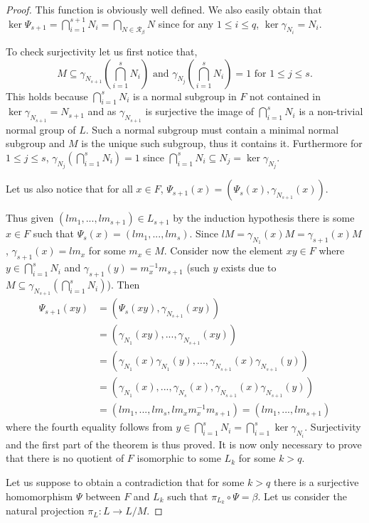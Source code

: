 \begin{proof}
    This function is obviously well defined. 
    We also easily obtain that $\ker \Psi_{s+1} = \bigcap_{i=1}^{s+1} N_i =\bigcap_{N \in \mathscr{R}_\beta}N$ since for any $1 \le i \le q$, $\ker \gamma_{N_i} = N_i$.

    To check surjectivity let us first notice that, 
    $$M \subseteq \gamma_{N_{s+1}}(\bigcap_{i=1}^s N_i) \text{ and } \gamma_{N_{j}}(\bigcap_{i=1}^s N_i) = 1 \text{ for } 1 \le j \le s.$$ 
    This holds because $\bigcap_{i=1}^s N_i$ is a normal subgroup in $F$ not contained in $\ker \gamma_{N_{s+1}} = N_{s+1}$ and as $\gamma_{N_{s+1}}$ is surjective the image of $\bigcap_{i=1}^s N_i$ is a non-trivial normal group of $L$. 
    Such a normal subgroup must contain a minimal normal subgroup and $M$ is the unique such subgroup, thus it contains it. 
    Furthermore for $1 \le j \le s$, $\gamma_{N_j}(\bigcap_{i=1}^s N_i) = 1$ since $\bigcap_{i=1}^s N_i \subseteq N_j = \ker \gamma_{N_j}$. 
    
    Let us also notice that for all $x \in F$, $\Psi_{s+1}(x) = (\Psi_{s}(x), \gamma_{N_{s+1}}(x))$.

    Thus given $(lm_1, ..., lm_{s+1}) \in L_{s+1}$ by the induction hypothesis there is some $x \in F$ such that $\Psi_{s}(x) = (lm_1, ..., lm_s)$.
    Since $lM = \gamma_{N_1}(x)M = \gamma_{s+1}(x)M$, $\gamma_{s+1}(x) = lm_x$ for some $m_x \in M$. 
    Consider now the element $xy \in F$ where $y \in \bigcap_{i=1}^s N_i$ and $\gamma_{s+1}(y) = m_x^{-1}m_{s+1}$ (such $y$ exists due to $M \subseteq \gamma_{N_{s+1}}(\bigcap_{i=1}^s N_i)$).
    Then 
    \begin{align*}
        \Psi_{s+1}(xy) &=  (\Psi_{s}(xy), \gamma_{N_{s+1}}(xy)) \\ 
        &= (\gamma_{N_1}(xy), ..., \gamma_{N_{s+1}}(xy)) \\
        &= (\gamma_{N_1}(x)\gamma_{N_1}(y), ..., \gamma_{N_{s+1}}(x)\gamma_{N_{s+1}}(y)) \\
        &= (\gamma_{N_1}(x), ...,\gamma_{N_s}(x), \gamma_{N_{s+1}}(x)\gamma_{N_{s+1}}(y)) \\
        &= (lm_1, ...,lm_s, lm_xm_x^{-1}m_{s+1}) = (lm_1, ..., lm_{s+1}) 
    \end{align*}
    where the fourth equality follows from $y \in \bigcap_{i=1}^s N_i = \bigcap_{i = 1}^s \ker \gamma_{N_i}$. Surjectivity and the first part of the theorem is thus proved. It is now only necessary to prove that there is no quotient of $F$ isomorphic to some $L_k$ for some $k > q$.

    Let us suppose to obtain a contradiction that for some $k > q$ there is a surjective homomorphism $\Psi$ between $F$ and $L_k$ such that $\pi_{L_k} \circ \Psi = \beta$. 
    Let us consider the natural projection $\pi_L \colon L \rightarrow L/M$.


\end{proof}
